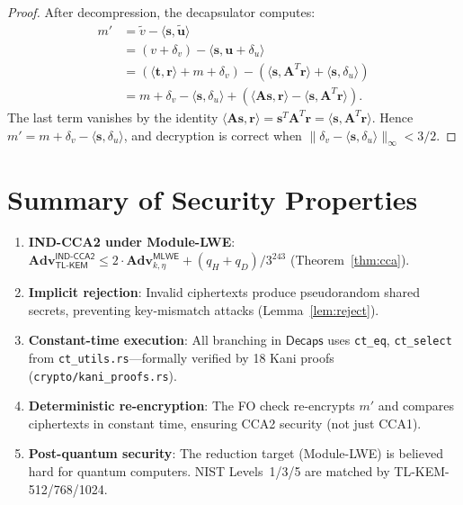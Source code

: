 \documentclass[11pt,a4paper]{article}
\theoremstyle{definition}
\newcommand{\Adv}{\mathbf{Adv}}
\newcommand{\Decaps}{\textsf{Decaps}}
\newcommand{\MLWE}{\textsf{MLWE}}
\newcommand{\TLKEM}{\textsf{TL-KEM}}
\newcommand{\INDCCA}{\textsf{IND-CCA2}}
\begin{document}
\begin{proof}
After decompression, the decapsulator computes:
\begin{align*}
  m' &= \tilde{v} - \langle \mathbf{s}, \tilde{\mathbf{u}} \rangle \\
     &= (v + \delta_v) - \langle \mathbf{s}, \mathbf{u} + \delta_u \rangle \\
     &= (\langle \mathbf{t}, \mathbf{r} \rangle + m + \delta_v)
       - (\langle \mathbf{s}, \mathbf{A}^T\mathbf{r} \rangle
       + \langle \mathbf{s}, \delta_u \rangle) \\
     &= m + \delta_v - \langle \mathbf{s}, \delta_u \rangle
       + (\langle \mathbf{A}\mathbf{s}, \mathbf{r} \rangle
       - \langle \mathbf{s}, \mathbf{A}^T\mathbf{r} \rangle).
\end{align*}
The last term vanishes by the identity $\langle \mathbf{A}\mathbf{s}, \mathbf{r} \rangle = \mathbf{s}^T \mathbf{A}^T \mathbf{r} = \langle \mathbf{s}, \mathbf{A}^T\mathbf{r} \rangle$. Hence $m' = m + \delta_v - \langle \mathbf{s}, \delta_u \rangle$, and decryption is correct when $\|\delta_v - \langle \mathbf{s}, \delta_u \rangle\|_\infty < 3/2$.
\end{proof}

\section{Summary of Security Properties}
\label{sec:summary}

\begin{enumerate}[leftmargin=2em, label=\textbf{P\arabic*.}]
  \item \textbf{IND-CCA2 under Module-LWE}: $\Adv^{\INDCCA}_{\TLKEM} \leq 2 \cdot \Adv^{\MLWE}_{k,\eta} + (q_H+q_D)/3^{243}$ (Theorem~\ref{thm:cca}).
  \item \textbf{Implicit rejection}: Invalid ciphertexts produce pseudorandom shared secrets, preventing key-mismatch attacks (Lemma~\ref{lem:reject}).
  \item \textbf{Constant-time execution}: All branching in $\Decaps$ uses \texttt{ct\_eq}, \texttt{ct\_select} from \texttt{ct\_utils.rs}---formally verified by 18 Kani proofs (\texttt{crypto/kani\_proofs.rs}).
  \item \textbf{Deterministic re-encryption}: The FO check re-encrypts $m'$ and compares ciphertexts in constant time, ensuring CCA2 security (not just CCA1).
  \item \textbf{Post-quantum security}: The reduction target (Module-LWE) is believed hard for quantum computers. NIST Levels~1/3/5 are matched by TL-KEM-512/768/1024.
\end{enumerate}
\end{document}
